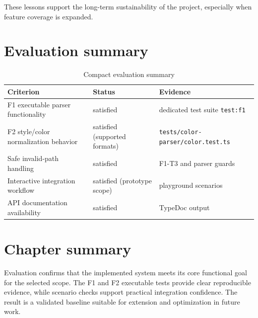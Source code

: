 These lessons support the long-term sustainability of the project, especially when feature coverage is expanded.

\section{Evaluation summary}

\begin{table}[htbp]
\centering
\caption{Compact evaluation summary}
\label{tab:evaluation_summary_compact}
\begin{tabular}{>{\raggedright\arraybackslash}p{4.2cm} >{\raggedright\arraybackslash}p{3.0cm} >{\raggedright\arraybackslash}p{5.0cm}}
\toprule
\textbf{Criterion} & \textbf{Status} & \textbf{Evidence} \\
\midrule
F1 executable parser functionality & satisfied & dedicated test suite \texttt{test:f1} \\
F2 style/color normalization behavior & satisfied (supported formats) & \texttt{tests/color-parser/color.test.ts} \\
Safe invalid-path handling & satisfied & F1-T3 and parser guards \\
Interactive integration workflow & satisfied (prototype scope) & playground scenarios \\
API documentation availability & satisfied & TypeDoc output \\
\bottomrule
\end{tabular}
\end{table}

\section{Chapter summary}

Evaluation confirms that the implemented system meets its core functional goal for the selected scope.
The F1 and F2 executable tests provide clear reproducible evidence, while scenario checks support practical integration confidence.
The result is a validated baseline suitable for extension and optimization in future work.
